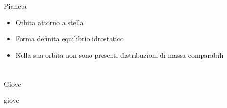 \begin{wordonframe}{Pianeta}

\begin{itemize}
\item Orbita attorno a stella
\item Forma definita equilibrio idrostatico
\item Nella sua orbita non sono presenti distribuzioni di massa comparabili
\end{itemize}

\end{wordonframe}


\section{}

\begin{frame}{Giove}


\end{frame}

\begin{wordonframe}{giove}


\end{wordonframe}
